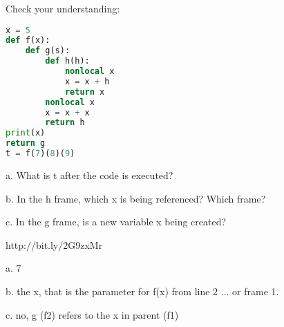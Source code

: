 \question
Check your understanding:
\begin{lstlisting}[language=Python]
x = 5
def f(x):
    def g(s):
        def h(h):
            nonlocal x
            x = x + h
            return x
        nonlocal x
        x = x + x
        return h
print(x)
return g
t = f(7)(8)(9)
\end{lstlisting}



a. What is t after the code is executed? 



b. In the h frame, which x is being referenced? Which frame? 



c. In the g frame, is a new variable x being created? 

\begin{solution}
http://bit.ly/2G9zxMr

a. 7

b. the x, that is the parameter for f(x) from line 2 ... or frame 1. 

c. no, g (f2) refers to the x in parent (f1)

\end{solution}

\newpage
